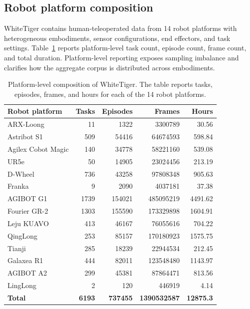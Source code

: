 \subsection{Robot platform composition}

WhiteTiger contains human-teleoperated data from 14 robot platforms with heterogeneous embodiments, sensor configurations, end effectors, and task settings. Table~\ref{tab:platform-comp} reports platform-level task count, episode count, frame count, and total duration. Platform-level reporting exposes sampling imbalance and clarifies how the aggregate corpus is distributed across embodiments.

\begin{table}[t]
\centering
\caption{Platform-level composition of WhiteTiger. The table reports tasks, episodes, frames, and hours for each of the 14 robot platforms.}
\label{tab:platform-comp}
\scriptsize
\begin{tabular}{lrrrr}
\toprule
Robot platform & Tasks & Episodes & Frames & Hours \\
\midrule
ARX-Loong & 11 & 1322 & 3300789 & 30.56 \\
Astribot S1 & 509 & 54416 & 64674593 & 598.84 \\
Agilex Cobot Magic & 140 & 34778 & 58221160 & 539.08 \\
UR5e & 50 & 14905 & 23024456 & 213.19 \\
D-Wheel & 736 & 43258 & 97808348 & 905.63 \\
Franka & 9 & 2090 & 4037181 & 37.38 \\
AGIBOT G1 & 1739 & 154021 & 485095219 & 4491.62 \\
Fourier GR-2 & 1303 & 155590 & 173329898 & 1604.91 \\
Leju KUAVO & 413 & 46167 & 76055616 & 704.22 \\
QingLong & 253 & 85157 & 170180923 & 1575.75 \\
Tianji & 285 & 18239 & 22944534 & 212.45 \\
Galaxea R1 & 444 & 82011 & 123548480 & 1143.97 \\
AGIBOT A2 & 299 & 45381 & 87864471 & 813.56 \\
LingLong & 2 & 120 & 446919 & 4.14 \\
\textbf{Total} & \textbf{6193} & \textbf{737455} & \textbf{1390532587} & \textbf{12875.3} \\
\bottomrule
\end{tabular}
\end{table}


